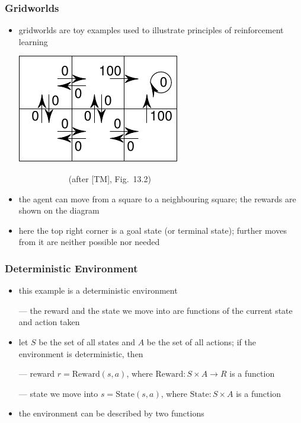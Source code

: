 \begin{frame}\frametitle{Gridworlds}
\begin{itemize}

\item gridworlds are toy examples used to illustrate principles of
reinforcement learning

\bigskip

\includegraphics[scale=1]{gridworld}
\begin{minipage}{5cm}
~~~~~~~~~~~~(after [TM], Fig.~13.2)
\end{minipage}

\item the agent can move from a square to a neighbouring square; the
rewards are shown on the diagram

\item here the top right corner is a \alert{goal state (or terminal
state)}; further moves from it are neither possible nor needed

\end{itemize}
\end{frame}

\begin{frame}\frametitle{Deterministic Environment}
\begin{itemize}

\item this example is a deterministic environment

--- the reward and the state we move into are functions of the current
    state and action taken

\item let $S$ be the set of all states and $A$ be the set of all
    actions; if the environment is deterministic, then


--- reward $r = \text{Reward}(s,a)$, where $\text{Reward}: S\times
    A\to R$ is a function

--- state we move into $s = \text{State}(s,a)$, where $\text{State}:
    S\times A$ is a function

\item the environment can be described by two functions

\end{itemize}
\end{frame}

